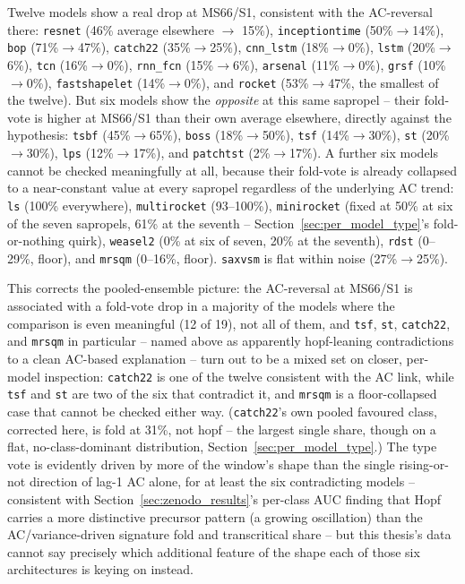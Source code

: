 Twelve models show a real drop at MS66/S1, consistent with the AC-reversal there: \texttt{resnet} (46\% average elsewhere $\rightarrow$ 15\%), \texttt{inceptiontime} (50\%$\rightarrow$14\%), \texttt{bop} (71\%$\rightarrow$47\%), \texttt{catch22} (35\%$\rightarrow$25\%), \texttt{cnn\_lstm} (18\%$\rightarrow$0\%), \texttt{lstm} (20\%$\rightarrow$6\%), \texttt{tcn} (16\%$\rightarrow$0\%), \texttt{rnn\_fcn} (15\%$\rightarrow$6\%), \texttt{arsenal} (11\%$\rightarrow$0\%), \texttt{grsf} (10\%$\rightarrow$0\%), \texttt{fastshapelet} (14\%$\rightarrow$0\%), and \texttt{rocket} (53\%$\rightarrow$47\%, the smallest of the twelve). But six models show the \emph{opposite} at this same sapropel -- their fold-vote is higher at MS66/S1 than their own average elsewhere, directly against the hypothesis: \texttt{tsbf} (45\%$\rightarrow$65\%), \texttt{boss} (18\%$\rightarrow$50\%), \texttt{tsf} (14\%$\rightarrow$30\%), \texttt{st} (20\%$\rightarrow$30\%), \texttt{lps} (12\%$\rightarrow$17\%), and \texttt{patchtst} (2\%$\rightarrow$17\%). A further six models cannot be checked meaningfully at all, because their fold-vote is already collapsed to a near-constant value at every sapropel regardless of the underlying AC trend: \texttt{ls} (100\% everywhere), \texttt{multirocket} (93--100\%), \texttt{minirocket} (fixed at 50\% at six of the seven sapropels, 61\% at the seventh -- Section~\ref{sec:per_model_type}'s fold-or-nothing quirk), \texttt{weasel2} (0\% at six of seven, 20\% at the seventh), \texttt{rdst} (0--29\%, floor), and \texttt{mrsqm} (0--16\%, floor). \texttt{saxvsm} is flat within noise (27\%$\rightarrow$25\%).

This corrects the pooled-ensemble picture: the AC-reversal at MS66/S1 is associated with a fold-vote drop in a majority of the models where the comparison is even meaningful (12 of 19), not all of them, and \texttt{tsf}, \texttt{st}, \texttt{catch22}, and \texttt{mrsqm} in particular -- named above as apparently hopf-leaning contradictions to a clean AC-based explanation -- turn out to be a mixed set on closer, per-model inspection: \texttt{catch22} is one of the twelve consistent with the AC link, while \texttt{tsf} and \texttt{st} are two of the six that contradict it, and \texttt{mrsqm} is a floor-collapsed case that cannot be checked either way. (\texttt{catch22}'s own pooled favoured class, corrected here, is fold at 31\%, not hopf -- the largest single share, though on a flat, no-class-dominant distribution, Section~\ref{sec:per_model_type}.) The type vote is evidently driven by more of the window's shape than the single rising-or-not direction of lag-1 AC alone, for at least the six contradicting models -- consistent with Section~\ref{sec:zenodo_results}'s per-class AUC finding that Hopf carries a more distinctive precursor pattern (a growing oscillation) than the AC/variance-driven signature fold and transcritical share -- but this thesis's data cannot say precisely which additional feature of the shape each of those six architectures is keying on instead.

